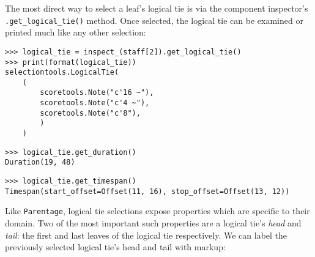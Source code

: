 \noindent The most direct way to select a leaf's logical tie is via the
component inspector's \texttt{.get\_logical\_tie()} method. Once selected, the
logical tie can be examined or printed much like any other selection:

\begin{comment}
<abjad>
logical_tie = inspect_(staff[2]).get_logical_tie()
print(format(logical_tie))
logical_tie.get_duration()
logical_tie.get_timespan()
</abjad>
\end{comment}

\begin{abjadbookoutput}
\begin{singlespacing}
\vspace{-0.5\baselineskip}
\begin{verbatim}
>>> logical_tie = inspect_(staff[2]).get_logical_tie()
>>> print(format(logical_tie))
selectiontools.LogicalTie(
    (
        scoretools.Note("c'16 ~"),
        scoretools.Note("c'4 ~"),
        scoretools.Note("c'8"),
        )
    )
\end{verbatim}
\begin{verbatim}
>>> logical_tie.get_duration()
Duration(19, 48)
\end{verbatim}
\begin{verbatim}
>>> logical_tie.get_timespan()
Timespan(start_offset=Offset(11, 16), stop_offset=Offset(13, 12))
\end{verbatim}
\end{singlespacing}
\end{abjadbookoutput}

\noindent Like \texttt{Parentage}, logical tie selections expose properties
which are specific to their domain. Two of the most important such properties
are a logical tie's \emph{head} and \emph{tail}: the first and last leaves of
the logical tie respectively. We can label the previously selected logical
tie's head and tail with markup:

\begin{comment}
<abjad>
logical_tie.head
logical_tie.tail
head_markup = Markup('head', direction=Up)
head_markup = head_markup.pad_around(0.5).box().pad_around(0.5)
tail_markup = Markup('tail', direction=Up)
tail_markup = tail_markup.pad_around(0.5).box().pad_around(0.5)
attach(head_markup, logical_tie.head)
attach(tail_markup, logical_tie.tail)
show(staff)
</abjad>
\end{comment}


